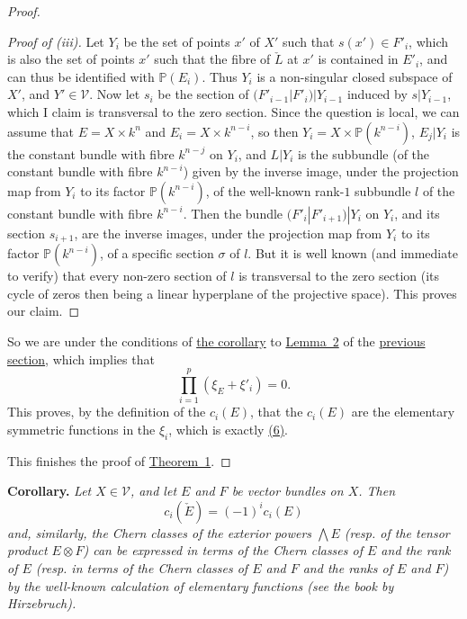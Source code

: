 \documentclass{article}
\newenvironment{itenv}[1]
  {\phantomsection\par\medskip\noindent\textbf{#1.}\itshape}
  {\medskip}
\renewcommand{\cal}[1]{{\mathcal{#1}}}
\newcommand{\oldpage}[1]{\marginpar{\footnotesize$\Big\vert$ \textit{p.~#1}}}
\begin{document}
\begin{proof}
\begin{proof}[Proof of \rm{(iii)}]
    Let $Y_i$ be the set of points $x'$ of $X'$ such that $s(x')\in F'_i$, which is also the set of points $x'$ such that the fibre of $\check{L}$ at $x'$ is contained in $E'_i$, and can thus be identified with $\mathbb{P}(E_i)$.
    Thus $Y_i$ is a non-singular closed subspace of $X'$, and $Y'\in\cal{V}$.
    Now let $s_i$ be the section of $(F'_{i-1}|F'_i)|Y_{i-1}$ induced by $s|Y_{i-1}$, which I claim is transversal to the zero section.
    Since the question is local, we
\oldpage{147}
    can assume that $E=X\times k^n$ and $E_i=X\times k^{n-i}$, so then $Y_i=X\times\mathbb{P}(k^{n-i})$, $E_j|Y_i$ is the constant bundle with fibre $k^{n-j}$ on $Y_i$, and $L|Y_i$ is the subbundle (of the constant bundle with fibre $k^{n-i}$) given by the inverse image, under the projection map from $Y_i$ to its factor $\mathbb{P}(k^{n-i})$, of the well-known rank-$1$ subbundle $l$ of the constant bundle with fibre $k^{n-i}$.
    Then the bundle $(F'_i|F'_{i+1})|Y_i$ on $Y_i$, and its section $s_{i+1}$, are the inverse images, under the projection map from $Y_i$ to its factor $\mathbb{P}(k^{n-i})$, of a specific section $\sigma$ of $l$.
    But it is well known (and immediate to verify) that every non-zero section of $l$ is transversal to the zero section (its cycle of zeros then being a linear hyperplane of the projective space).
    This proves our claim.
  \end{proof}

  So we are under the conditions of \hyperref[lemma2corollary]{the corollary} to \hyperref[lemma2]{Lemma~2} of the \hyperref[section2]{previous section}, which implies that
  \[
    \prod_{i=1}^p (\xi_E+\xi'_i) = 0.
  \]
  This proves, by the definition of the $c_i(E)$, that the $c_i(E)$ are the elementary symmetric functions in the $\xi_i$, which is exactly \hyperref[equation6]{(6)}.

  This finishes the proof of \hyperref[theorem1]{Theorem~1}.
\end{proof}

\begin{itenv}{Corollary}
\label{theorem1corollary}
  Let $X\in\cal{V}$, and let $E$ and $F$ be vector bundles on $X$.
  Then
  \[
  \label{equation7}
    c_i(\check{E}) = (-1)^i c_i(E)
  \tag{7}
  \]
  and, similarly, the Chern classes of the exterior powers $\bigwedge E$ (resp. of the tensor product $E\otimes F$) can be expressed in terms of the Chern classes of $E$ and the rank of $E$ (resp. in terms of the Chern classes of $E$ and $F$ and the ranks of $E$ and $F$) by the well-known calculation of elementary functions (see the book by Hirzebruch).
\end{itenv}
\end{document}
